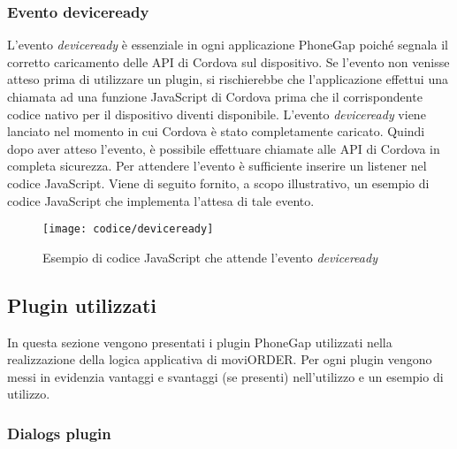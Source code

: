 \subsubsection{Evento deviceready}

L'evento \textit{deviceready} è essenziale in ogni applicazione PhoneGap poiché segnala il corretto caricamento delle API di Cordova sul dispositivo. Se l'evento non venisse atteso prima di utilizzare un plugin, si rischierebbe che l'applicazione effettui una chiamata ad una funzione JavaScript di Cordova prima che il corrispondente codice nativo per il dispositivo diventi disponibile. L'evento \textit{deviceready} viene lanciato nel momento in cui Cordova è stato completamente caricato. Quindi dopo aver atteso l'evento, è possibile effettuare chiamate alle API di Cordova in completa sicurezza. Per attendere l'evento è sufficiente inserire un listener nel codice JavaScript. Viene di seguito fornito, a scopo illustrativo, un esempio di codice JavaScript che implementa l'attesa di tale evento.

\begin{figure}[!h] 
    \centering 
    \texttt{[image: codice/deviceready]} 
    \caption{Esempio di codice JavaScript che attende l'evento \textit{deviceready}}
\end{figure}

\subsection{Plugin utilizzati}

In questa sezione vengono presentati i plugin PhoneGap utilizzati nella realizzazione della logica applicativa di moviORDER. Per ogni plugin vengono messi in evidenzia vantaggi e svantaggi (se presenti) nell'utilizzo e un esempio di utilizzo.

\subsubsection{Dialogs plugin}

